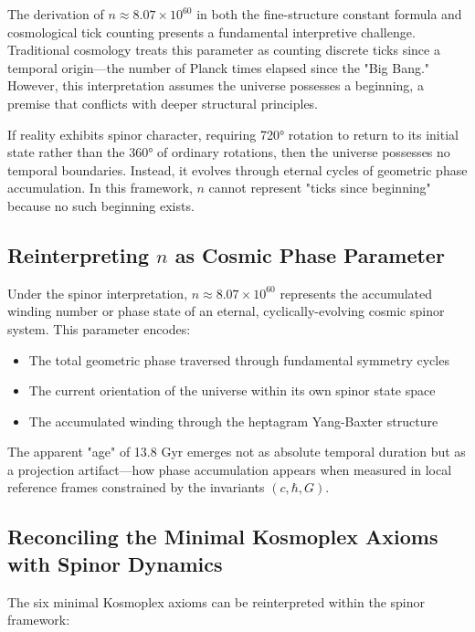 \documentclass[pdflatex,sn-mathphys-num]{sn-jnl}
\theoremstyle{thmstyleone}
\theoremstyle{thmstyletwo}
\theoremstyle{thmstylethree}
\begin{document}
\begin{appendices}
The derivation of $n \approx 8.07 \times 10^{60}$ in both the fine-structure constant formula and cosmological tick counting presents a fundamental interpretive challenge. Traditional cosmology treats this parameter as counting discrete ticks since a temporal origin—the number of Planck times elapsed since the "Big Bang." However, this interpretation assumes the universe possesses a beginning, a premise that conflicts with deeper structural principles.

If reality exhibits spinor character, requiring 720° rotation to return to its initial state rather than the 360° of ordinary rotations, then the universe possesses no temporal boundaries. Instead, it evolves through eternal cycles of geometric phase accumulation. In this framework, $n$ cannot represent "ticks since beginning" because no such beginning exists.

\subsection{Reinterpreting $n$ as Cosmic Phase Parameter}

Under the spinor interpretation, $n \approx 8.07 \times 10^{60}$ represents the accumulated winding number or phase state of an eternal, cyclically-evolving cosmic spinor system. This parameter encodes:

\begin{itemize}
\item The total geometric phase traversed through fundamental symmetry cycles
\item The current orientation of the universe within its own spinor state space  
\item The accumulated winding through the heptagram Yang-Baxter structure
\end{itemize}

The apparent "age" of 13.8 Gyr emerges not as absolute temporal duration but as a projection artifact—how phase accumulation appears when measured in local reference frames constrained by the invariants $(c, \hbar, G)$.

\subsection{Reconciling the Minimal Kosmoplex Axioms with Spinor Dynamics}

The six minimal Kosmoplex axioms can be reinterpreted within the spinor framework:


\end{appendices}
\end{document}
